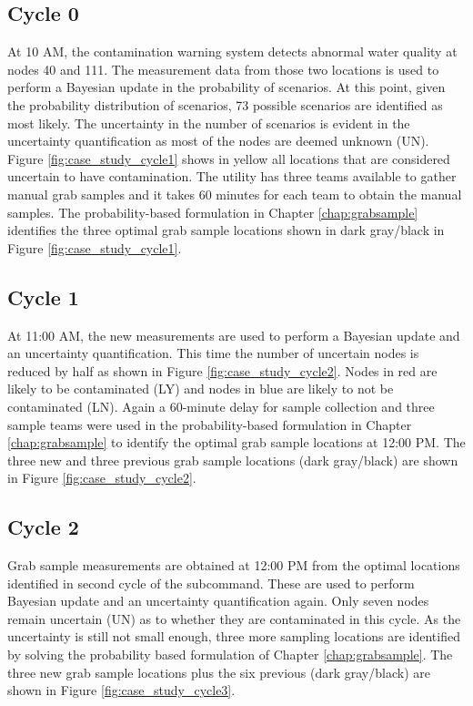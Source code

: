 \subsection{Cycle 0}
At 10 AM, the contamination warning system detects abnormal water quality at nodes 40 and 111. The measurement data from those two locations is used to 
perform a Bayesian update in the probability of scenarios. At this point, given the probability distribution of scenarios, 73 possible scenarios are 
identified as most likely. The uncertainty in the number of scenarios is evident in the uncertainty quantification as most of the nodes are deemed unknown (UN). 
Figure \ref{fig:case_study_cycle1} shows in yellow all locations that are considered uncertain to have contamination. 
The utility has three teams available to gather manual grab samples and it takes 60 minutes for each team to 
obtain the manual samples. The probability-based formulation in Chapter \ref{chap:grabsample} identifies the three optimal grab sample locations shown 
in dark gray/black in Figure \ref{fig:case_study_cycle1}.             

\subsection{Cycle 1}
At 11:00 AM, the new measurements are used to perform a Bayesian update and an uncertainty quantification. 
This time the number of uncertain nodes is reduced by half as shown in Figure \ref{fig:case_study_cycle2}. Nodes in red are likely to be contaminated (LY) and 
nodes in blue are likely to not be contaminated (LN). Again a 60-minute delay for sample collection and three sample teams were used in the probability-based 
formulation in Chapter \ref{chap:grabsample} to identify the optimal grab sample locations at 12:00 PM. The three new and three previous grab sample locations (dark gray/black) are shown in Figure \ref{fig:case_study_cycle2}.
        
\subsection{Cycle 2}
Grab sample measurements are obtained at 12:00 PM from the optimal locations identified in second cycle of the  subcommand. 
These are used to perform Bayesian update and an uncertainty quantification again. 
Only seven nodes remain uncertain (UN) as to whether they are contaminated in this cycle. As the uncertainty is still not small enough, three more sampling locations are 
identified by solving the probability based formulation of Chapter \ref{chap:grabsample}. The three new grab sample locations plus the six previous (dark gray/black) are shown in 
Figure \ref{fig:case_study_cycle3}.

